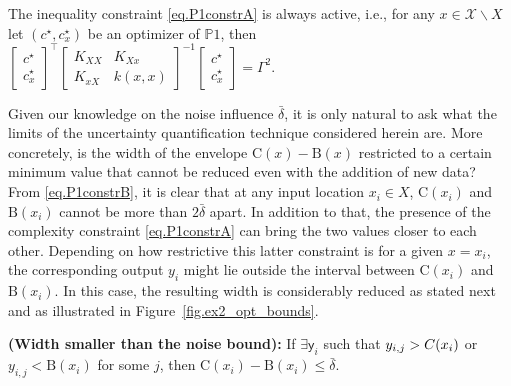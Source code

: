 \begin{proposition} 
	\label{prop.complex_constraint_always_active}
	The inequality constraint \eqref{eq.P1constrA} is always active, i.e., for any $x \in \mathcal{X} \backslash X $ let $(c^\star,c_x^\star)$ be an optimizer of $\mathds{P}1$, then $\begin{bmatrix}
		c ^\star\\
		c_x^\star
	\end{bmatrix}^\top 
	\begin{bmatrix}
		K_{XX} & K_{Xx} \\
		K_{xX} & k(x,x)
	\end{bmatrix}^{-1} 
	\begin{bmatrix}
		c^\star \\
		c_x^\star
	\end{bmatrix} = \Gamma^2 $. 
\end{proposition}

Given our knowledge on the noise influence $\bar \delta$, it is only natural to ask what the limits of the uncertainty quantification technique considered herein are. More concretely, is the width of the envelope $\text{C}(x) - \text{B}(x)$ restricted to a certain minimum value that cannot be reduced even with the addition of new data? From \eqref{eq.P1constrB}, it is clear that at any input location $x_i \in X$, $\text{C}(x_i)$ and $\text{B}(x_i)$ cannot be more than $2\bar \delta$ apart. In addition to that, the presence of the complexity constraint \eqref{eq.P1constrA} can bring the two values closer to each other. Depending on how restrictive this latter constraint is for a given $x = x_i$, the corresponding output $y_i$ might lie outside the interval between $\text{C}(x_i)$ and $\text{B}(x_i)$. In this case, the resulting width is considerably reduced as stated next and as illustrated in Figure~\ref{fig.ex2_opt_bounds}.

\begin{proposition} 
	\label{prop.smallWidth}
	{\normalfont \textbf{(Width smaller than the noise bound):}}
	If $\exists \mathsf{y}_i$ such that $y_{i,j} > {\normalfont C}(x_i)$ or $y_{i,j} < \text{B}(x_i)$ for some $j$, then $\text{C}(x_i) - \text{B}(x_i) \leq \bar \delta$.
\end{proposition}

